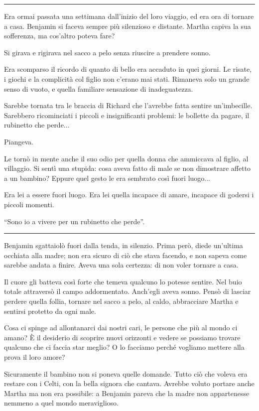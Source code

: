 \documentclass[a4paper,11pt,oneside,openright,final]{memoir}
\begin{document}
\plainbreak{1}

Era ormai passata una settimana dall'inizio del loro viaggio, ed era ora di
tornare a casa. Benjamin si faceva sempre più silenzioso e distante. Martha
capiva la sua sofferenza, ma cos'altro poteva fare?

Si girava e rigirava nel sacco a pelo senza riuscire a prendere sonno.

Era scomparso il ricordo di quanto di bello era accaduto in quei giorni. Le
risate, i giochi e la complicità col figlio non c'erano mai stati. Rimaneva
solo un grande senso di vuoto, e quella familiare sensazione di inadeguatezza.

Sarebbe tornata tra le braccia di Richard che l'avrebbe fatta sentire
un'imbecille. Sarebbero ricominciati i piccoli e insignificanti problemi: le
bollette da pagare, il rubinetto che perde...

Piangeva.

Le tornò in mente anche il suo odio per quella donna che ammiccava al figlio,
al villaggio. Si sentì una stupida: cosa aveva fatto di male se non dimostrare
affetto a un bambino? Eppure quel gesto le era sembrato così fuori luogo...

Era lei a essere fuori luogo. Era lei quella incapace di amare, incapace di
godersi i piccoli momenti.

``Sono io a vivere per un rubinetto che perde''.
\plainbreak{1}

Benjamin sgattaiolò fuori dalla tenda, in silenzio. Prima però, diede
un'ultima occhiata alla madre; non era sicuro di ciò che stava facendo, e non
sapeva come sarebbe andata a finire. Aveva una sola certezza: di non voler
tornare a casa.

Il cuore gli batteva così forte che temeva qualcuno lo potesse sentire. Nel
buio totale attraversò il campo addormentato. Anch'egli aveva sonno. Pensò di
lasciar perdere quella follia, tornare nel sacco a pelo, al caldo, abbracciare
Martha e sentirsi protetto da ogni male.

Cosa ci spinge ad allontanarci dai nostri cari, le persone che più al mondo ci
amano? È il desiderio di scoprire nuovi orizzonti e vedere se possiamo trovare
qualcuno che ci faccia star meglio? O lo facciamo perché vogliamo mettere alla
prova il loro amore?

Sicuramente il bambino non si poneva quelle domande. Tutto ciò che voleva era
restare con i Celti, con la bella signora che cantava. Avrebbe voluto portare
anche Martha ma non era possibile: a Benjamin pareva che la madre non
appartenesse nemmeno a quel mondo meraviglioso.
\end{document}
